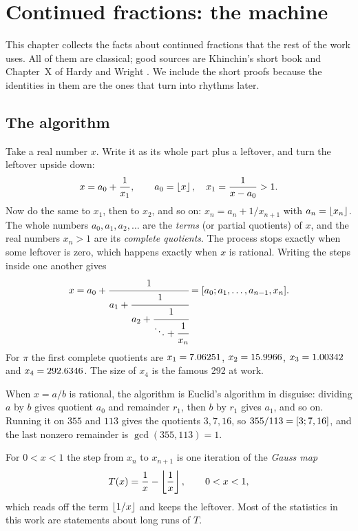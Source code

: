 \chapter{Continued fractions: the machine}\label{ch:cf}

This chapter collects the facts about continued fractions that the rest of the work uses. All of them are classical; good sources are Khinchin's short book \citep{Khinchin1964} and Chapter~X of Hardy and Wright \citep{HardyWright2008}. We include the short proofs because the identities in them are the ones that turn into rhythms later.

\section{The algorithm}

Take a real number $x$. Write it as its whole part plus a leftover, and turn the leftover upside down:
\begin{equation}\label{eq:cf-step}
  x = a_0 + \frac{1}{x_1}, \qquad a_0 = \left\lfloor x\right\rfloor, \quad x_1 = \frac{1}{x - a_0} > 1.
\end{equation}
Now do the same to $x_1$, then to $x_2$, and so on: $x_n = a_n + 1/x_{n+1}$ with $a_n = \left\lfloor x_n\right\rfloor$. The whole numbers $a_0, a_1, a_2, \dots$ are the \emph{terms} (or partial quotients) of $x$, and the real numbers $x_n > 1$ are its \emph{complete quotients}. The process stops exactly when some leftover is zero, which happens exactly when $x$ is rational. Writing the steps inside one another gives
\[
  x = a_0 + \cfrac{1}{a_1 + \cfrac{1}{a_2 + \cfrac{1}{\ddots + \cfrac{1}{x_{n}}}}} = [a_0; a_1, \dots, a_{n-1}, x_n].
\]
For $\pi$ the first complete quotients are $x_1 = 7.06251$, $x_2 = 15.9966$, $x_3 = 1.00342$ and $x_4 = 292.6346$. The size of $x_4$ is the famous 292 at work.

When $x = a/b$ is rational, the algorithm is Euclid's algorithm in disguise: dividing $a$ by $b$ gives quotient $a_0$ and remainder $r_1$, then $b$ by $r_1$ gives $a_1$, and so on. Running it on $355$ and $113$ gives the quotients $3, 7, 16$, so $355/113 = [3; 7, 16]$, and the last nonzero remainder is $\gcd(355,113) = 1$.

For $0 < x < 1$ the step from $x_n$ to $x_{n+1}$ is one iteration of the \emph{Gauss map}
\begin{equation}\label{eq:gauss-map}
  T(x) = \frac{1}{x} - \left\lfloor \frac{1}{x}\right\rfloor, \qquad 0 < x < 1,
\end{equation}
which reads off the term $\left\lfloor 1/x\right\rfloor$ and keeps the leftover. Most of the statistics in this work are statements about long runs of $T$.

